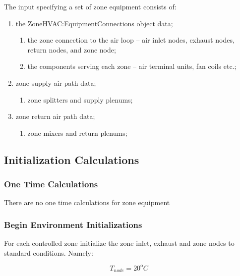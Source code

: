 The input specifying a set of zone equipment consists of:

\begin{enumerate}
\def\labelenumi{\arabic{enumi}.}
\def\labelenumii{\alph{enumii}.}
\def\labelenumiii{\roman{enumiii}.}
  \item
    the ZoneHVAC:EquipmentConnections object data;
    \begin{enumerate}
      \item the zone connection to the air loop – air inlet nodes, exhaust nodes, return nodes, and zone node;
      \item the components serving each zone – air terminal units, fan coils etc.;
    \end{enumerate}
  \item
    zone supply air path data;
    \begin{enumerate}
      \item zone splitters and supply plenums;
    \end{enumerate}
  \item
    zone return air path data;
    \begin{enumerate}
      \item zone mixers and return plenums;
    \end{enumerate}
\end{enumerate}

\subsection{Initialization Calculations}\label{initialization-calculations-000}

\subsubsection{One Time Calculations}\label{one-time-calculations-000}

There are no one time calculations for zone equipment

\subsubsection{Begin Environment Initializations}\label{begin-environment-initializations-000}

For each controlled zone initialize the zone inlet, exhaust and zone nodes to standard conditions. Namely:

\begin{equation}
{T_{node}} = {20^{\mathrm{o}}}C
\end{equation}

